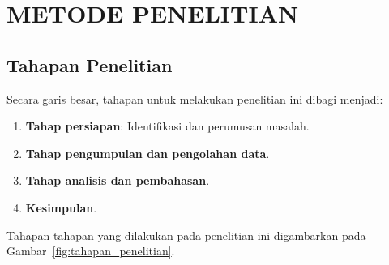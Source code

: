 \chapter{METODE PENELITIAN}

\section{Tahapan Penelitian}
Secara garis besar, tahapan untuk melakukan penelitian ini dibagi menjadi:
\begin{enumerate}
    \item \textbf{Tahap persiapan}: Identifikasi dan perumusan masalah.
    \item \textbf{Tahap pengumpulan dan pengolahan data}.
    \item \textbf{Tahap analisis dan pembahasan}.
    \item \textbf{Kesimpulan}.
\end{enumerate}

Tahapan-tahapan yang dilakukan pada penelitian ini digambarkan pada Gambar~\ref{fig:tahapan_penelitian}.

